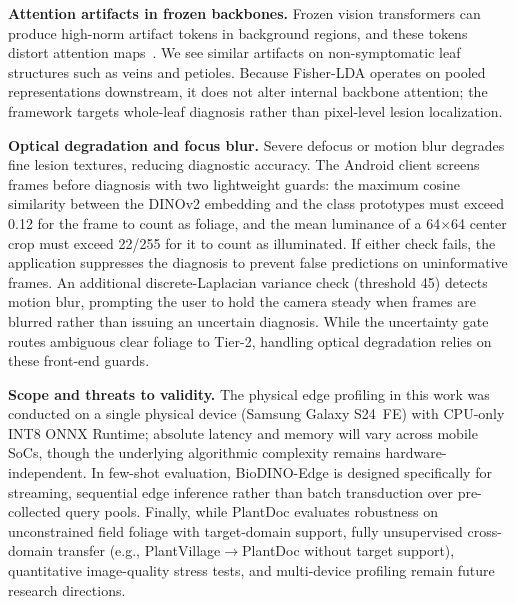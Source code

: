 \documentclass[preprint,12pt]{elsarticle}
\begin{document}
\textbf{Attention artifacts in frozen backbones.} Frozen vision transformers can produce high-norm artifact tokens in background regions, and these tokens distort attention maps~\cite{darcet2024vision}. We see similar artifacts on non-symptomatic leaf structures such as veins and petioles. Because Fisher-LDA operates on pooled representations downstream, it does not alter internal backbone attention; the framework targets whole-leaf diagnosis rather than pixel-level lesion localization.

\textbf{Optical degradation and focus blur.} Severe defocus or motion blur degrades fine lesion textures, reducing diagnostic accuracy. The Android client screens frames before diagnosis with two lightweight guards: the maximum cosine similarity between the DINOv2 embedding and the class prototypes must exceed 0.12 for the frame to count as foliage, and the mean luminance of a 64$\times$64 center crop must exceed 22/255 for it to count as illuminated. If either check fails, the application suppresses the diagnosis to prevent false predictions on uninformative frames. An additional discrete-Laplacian variance check (threshold 45) detects motion blur, prompting the user to hold the camera steady when frames are blurred rather than issuing an uncertain diagnosis. While the uncertainty gate routes ambiguous clear foliage to Tier-2, handling optical degradation relies on these front-end guards.

\textbf{Scope and threats to validity.} The physical edge profiling in this work was conducted on a single physical device (Samsung Galaxy S24~FE) with CPU-only INT8 ONNX Runtime; absolute latency and memory will vary across mobile SoCs, though the underlying algorithmic complexity remains hardware-independent. In few-shot evaluation, BioDINO-Edge is designed specifically for streaming, sequential edge inference rather than batch transduction over pre-collected query pools. Finally, while PlantDoc evaluates robustness on unconstrained field foliage with target-domain support, fully unsupervised cross-domain transfer (e.g., PlantVillage$\rightarrow$PlantDoc without target support), quantitative image-quality stress tests, and multi-device profiling remain future research directions.

\end{document}
